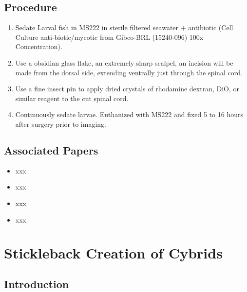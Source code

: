 \documentclass[
  letterpaper,
  DIV=11,
  numbers=noendperiod]{scrreprt}
\providecommand{\tightlist}{%
  \setlength{\itemsep}{0pt}\setlength{\parskip}{0pt}}\usepackage{longtable,booktabs,array}
\begin{document}
\hypertarget{procedure-45}{%
\section{Procedure}\label{procedure-45}}

\begin{enumerate}
\def\labelenumi{\arabic{enumi}.}
\tightlist
\item
  Sedate Larval fish in MS222 in sterile filtered seawater + antibiotic
  (Cell Culture anti-biotic/mycotic from Gibco-BRL (15240-096) 100x
  Concentration).
\item
  Use a obsidian glass flake, an extremely sharp scalpel, an incision
  will be made from the dorsal side, extending ventrally just through
  the spinal cord.
\item
  Use a fine insect pin to apply dried crystals of rhodamine dextran,
  DiO, or similar reagent to the cut spinal cord.
\item
  Continuously sedate larvae. Euthanized with MS222 and fixed 5 to 16
  hours after surgery prior to imaging.
\end{enumerate}

\hypertarget{associated-papers-29}{%
\section{Associated Papers}\label{associated-papers-29}}

\begin{itemize}
\tightlist
\item
  xxx
\item
  xxx
\item
  xxx
\item
  xxx
\end{itemize}

\hypertarget{sec-Vert_Exp_stickleback_cybrid}{%
\chapter{Stickleback Creation of
Cybrids}\label{sec-Vert_Exp_stickleback_cybrid}}

\hypertarget{introduction-50}{%
\section{Introduction}\label{introduction-50}}
\end{document}
